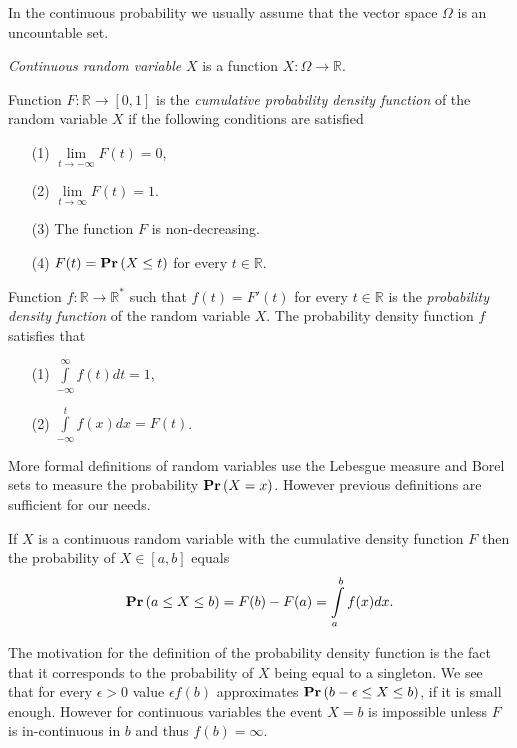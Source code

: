 In the continuous probability we usually assume that the vector space $\Omega$ is an uncountable set.
\begin{definition}
\emph{Continuous random variable} $X$ is a function $X: \Omega \rightarrow \mathbb{R}$. 

Function $F: \mathbb{R} \rightarrow \left[0, 1\right]$ is the \emph{cumulative probability density function} of the random variable $X$ if the following conditions are satisfied
\begin{enumerate}
\item[(1)] $\lim\limits_{t \rightarrow -\infty} F(t) = 0$,
\item[(2)] $\lim\limits_{t \rightarrow \infty} F(t) = 1$.
\item[(3)] The function $F$ is non-decreasing.
\item[(4)] $F(t) = \mathbf{Pr}\left(X \leq t\right) $ for every $t \in \mathbb{R}$.
\end{enumerate}

Function $f: \mathbb{R} \rightarrow \mathbb{R}^{*}$ such that $f(t) = F'(t)$ for every $t \in \mathbb{R}$ is the \emph{probability density function} of the random variable $X$. The probability density function $f$ satisfies that
\begin{enumerate}
\item[(1)] $\int\limits_{-\infty}^{\infty} f(t) dt = 1$,
\item[(2)] $\int\limits_{-\infty}^{t} f(x) dx = F(t)$.
\end{enumerate}
\end{definition}

More formal definitions of random variables use the Lebesgue measure and Borel sets to measure the probability $\mathbf{Pr}\left(X = x\right)$. However previous definitions are sufficient for our needs.

If $X$ is a continuous random variable with the cumulative density function $F$ then the probability of $X \in \left[a, b\right]$ equals
\[
\mathbf{Pr}\left(a \leq X \leq b\right) = F(b) - F(a) = \int\limits_{a}^{b} f(x) dx \text{.}
\]

The motivation for the definition of the probability density function is the fact that it corresponds to the probability of $X$ being equal to a singleton. We see that for every $\epsilon > 0$ value $\epsilon f(b)$ approximates $\mathbf{Pr}\left(b - \epsilon \leq X \leq b\right)$, if it is small enough. However for continuous variables the event $X = b$ is impossible unless $F$ is in-continuous in $b$ and thus $f(b) = \infty$.	

